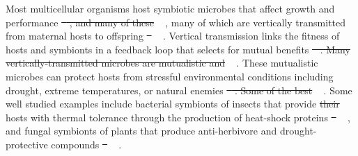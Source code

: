 \documentclass[lineno, sn-basic]{sn-jnl}%
\providecommand{\DIFadd}[1]{{\protect\color{blue}#1}} %
\providecommand{\DIFdel}[1]{{\protect\color{red}\protect\scriptsize\sout{#1}}}
\providecommand{\DIFadd}[1]{{\protect\color{blue}\uwave{#1}}} %
\providecommand{\DIFdel}[1]{{\protect\color{red}\sout{#1}}}                      %
\providecommand{\DIFaddbegin}{} %
\providecommand{\DIFaddend}{} %
\providecommand{\DIFdelbegin}{} %
\providecommand{\DIFdelend}{} %
\newcommand{\DIFscaledelfig}{0.5}
\newlength{\DIFdelgraphicswidth} %
\newlength{\DIFdelgraphicsheight} %
\newcommand{\DIFaddincludegraphics}[2][]{{\color{blue}\fbox{\DIFOincludegraphics[#1]{#2}}}} %
\newcommand{\DIFdelincludegraphics}[2][]{%
\sbox{\DIFdelgraphicsbox}{\DIFOincludegraphics[#1]{#2}}%
\settoboxwidth{\DIFdelgraphicswidth}{\DIFdelgraphicsbox} %
\settoboxtotalheight{\DIFdelgraphicsheight}{\DIFdelgraphicsbox} %
\scalebox{\DIFscaledelfig}{%
\parbox[b]{\DIFdelgraphicswidth}{\usebox{\DIFdelgraphicsbox}\\[-\baselineskip] \rule{\DIFdelgraphicswidth}{0em}}\llap{\resizebox{\DIFdelgraphicswidth}{\DIFdelgraphicsheight}{%
\setlength{\unitlength}{\DIFdelgraphicswidth}%
\begin{picture}(1,1)%
\thicklines\linethickness{2pt} %
{\color[rgb]{1,0,0}\put(0,0){\framebox(1,1){}}}%
{\color[rgb]{1,0,0}\put(0,0){\line( 1,1){1}}}%
{\color[rgb]{1,0,0}\put(0,1){\line(1,-1){1}}}%
\end{picture}%
}\hspace*{3pt}}} %
} %
\DeclareRobustCommand{\DIFaddbegin}{\DIFOaddbegin \let\includegraphics\DIFaddincludegraphics} %
\DeclareRobustCommand{\DIFaddend}{\DIFOaddend \let\includegraphics\DIFOincludegraphics} %
\DeclareRobustCommand{\DIFdelbegin}{\DIFOdelbegin \let\includegraphics\DIFdelincludegraphics} %
\DeclareRobustCommand{\DIFdelend}{\DIFOaddend \let\includegraphics\DIFOincludegraphics} %
\begin{document}
Most multicellular organisms host symbiotic microbes that affect growth and performance \DIFdelbegin \DIFdel{\mbox{%
\cite{rodriguez2009fungal,mcfall2013animals}}\hspace{0pt}%
, and many of these }\DIFdelend \DIFaddbegin \DIFadd{\mbox{%
\citep{rodriguez2009fungal,mcfall2013animals}}\hspace{0pt}%
, many of which }\DIFaddend are vertically transmitted from maternal hosts to offspring \DIFdelbegin \DIFdel{\mbox{%
\cite{funkhouser2013mom}}\hspace{0pt}%
}\DIFdelend \DIFaddbegin \DIFadd{\mbox{%
\citep{funkhouser2013mom}}\hspace{0pt}%
}\DIFaddend .
Vertical transmission links the fitness of hosts and symbionts in a feedback loop that selects for mutual benefits \DIFdelbegin \DIFdel{\mbox{%
\cite{fine1975vectors}}\hspace{0pt}%
.
Many vertically-transmitted microbes are mutualistic and }\DIFdelend \DIFaddbegin \DIFadd{\mbox{%
\citep{fine1975vectors}}\hspace{0pt}%
.
These mutualistic microbes can }\DIFaddend protect hosts from stressful environmental conditions including drought, extreme temperatures, or natural enemies \DIFdelbegin \DIFdel{\mbox{%
\cite{russell2006costs, kivlin2013fungal}}\hspace{0pt}%
. 
Some of the best }\DIFdelend \DIFaddbegin \DIFadd{\mbox{%
\citep{russell2006costs, kivlin2013fungal}}\hspace{0pt}%
. 
Some well }\DIFaddend studied examples include bacterial symbionts of insects that provide \DIFdelbegin \DIFdel{their }\DIFdelend hosts with thermal tolerance through the production of heat-shock proteins \DIFdelbegin \DIFdel{\mbox{%
\cite{dunbar2007aphid}}\hspace{0pt}%
}\DIFdelend \DIFaddbegin \DIFadd{\mbox{%
\citep{dunbar2007aphid}}\hspace{0pt}%
}\DIFaddend , and fungal symbionts of plants that produce anti-herbivore and drought-protective compounds \DIFdelbegin \DIFdel{\mbox{%
\cite{reyna2012detection,saikkonen2013chemical,neyaz2022localization}}\hspace{0pt}%
}\DIFdelend \DIFaddbegin \DIFadd{\mbox{%
\citep{reyna2012detection,saikkonen2013chemical,neyaz2022localization}}\hspace{0pt}%
}\DIFaddend .
\end{document}
